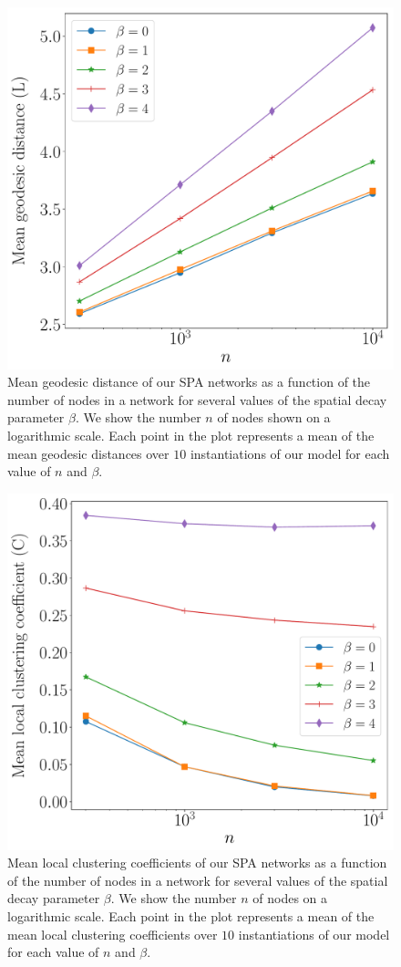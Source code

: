 \documentclass[%
 reprint,
 amsmath,amssymb,
 aps,
]{revtex4-1}
\begin{document}
\begin{figure}
    \centering
    \includegraphics[width=0.75\linewidth]{PA_log_geodesic.pdf}
    \caption{Mean geodesic distance of our SPA networks as a function of the number of nodes in a network for several values of the spatial decay parameter $\beta$.
    We show the number $n$ of nodes shown on a logarithmic scale. Each point in the plot represents a mean of the mean geodesic distances over $10$ instantiations of our model for each value of $n$ and $\beta$.
    }
    \label{fig:PA_geodesic}
\end{figure}




\begin{figure}
    \centering
    \includegraphics[width=0.75\linewidth]{PA_log_clustering.pdf}
    \caption{Mean local clustering coefficients of our SPA networks as a function of the number of nodes in a network for several values of the spatial decay parameter $\beta$.
    We show the number $n$ of nodes on a logarithmic scale. Each point in the plot represents a mean of the mean local clustering coefficients over $10$ instantiations of our model for each value of $n$ and $\beta$.
    }
    \label{fig:PA_clustering}
\end{figure}
\end{document}
